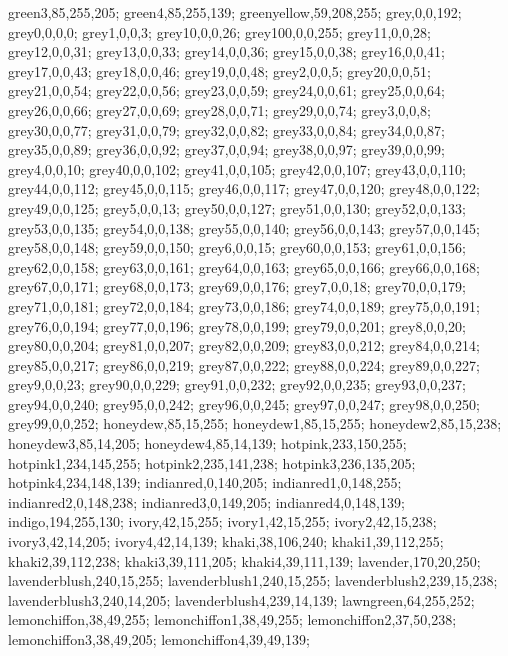 {green3,85,255,205;%
green4,85,255,139;%
greenyellow,59,208,255;%
grey,0,0,192;%
grey0,0,0,0;%
grey1,0,0,3;%
grey10,0,0,26;%
grey100,0,0,255;%
grey11,0,0,28;%
grey12,0,0,31;%
grey13,0,0,33;%
grey14,0,0,36;%
grey15,0,0,38;%
grey16,0,0,41;%
grey17,0,0,43;%
grey18,0,0,46;%
grey19,0,0,48;%
grey2,0,0,5;%
grey20,0,0,51;%
grey21,0,0,54;%
grey22,0,0,56;%
grey23,0,0,59;%
grey24,0,0,61;%
grey25,0,0,64;%
grey26,0,0,66;%
grey27,0,0,69;%
grey28,0,0,71;%
grey29,0,0,74;%
grey3,0,0,8;%
grey30,0,0,77;%
grey31,0,0,79;%
grey32,0,0,82;%
grey33,0,0,84;%
grey34,0,0,87;%
grey35,0,0,89;%
grey36,0,0,92;%
grey37,0,0,94;%
grey38,0,0,97;%
grey39,0,0,99;%
grey4,0,0,10;%
grey40,0,0,102;%
grey41,0,0,105;%
grey42,0,0,107;%
grey43,0,0,110;%
grey44,0,0,112;%
grey45,0,0,115;%
grey46,0,0,117;%
grey47,0,0,120;%
grey48,0,0,122;%
grey49,0,0,125;%
grey5,0,0,13;%
grey50,0,0,127;%
grey51,0,0,130;%
grey52,0,0,133;%
grey53,0,0,135;%
grey54,0,0,138;%
grey55,0,0,140;%
grey56,0,0,143;%
grey57,0,0,145;%
grey58,0,0,148;%
grey59,0,0,150;%
grey6,0,0,15;%
grey60,0,0,153;%
grey61,0,0,156;%
grey62,0,0,158;%
grey63,0,0,161;%
grey64,0,0,163;%
grey65,0,0,166;%
grey66,0,0,168;%
grey67,0,0,171;%
grey68,0,0,173;%
grey69,0,0,176;%
grey7,0,0,18;%
grey70,0,0,179;%
grey71,0,0,181;%
grey72,0,0,184;%
grey73,0,0,186;%
grey74,0,0,189;%
grey75,0,0,191;%
grey76,0,0,194;%
grey77,0,0,196;%
grey78,0,0,199;%
grey79,0,0,201;%
grey8,0,0,20;%
grey80,0,0,204;%
grey81,0,0,207;%
grey82,0,0,209;%
grey83,0,0,212;%
grey84,0,0,214;%
grey85,0,0,217;%
grey86,0,0,219;%
grey87,0,0,222;%
grey88,0,0,224;%
grey89,0,0,227;%
grey9,0,0,23;%
grey90,0,0,229;%
grey91,0,0,232;%
grey92,0,0,235;%
grey93,0,0,237;%
grey94,0,0,240;%
grey95,0,0,242;%
grey96,0,0,245;%
grey97,0,0,247;%
grey98,0,0,250;%
grey99,0,0,252;%
honeydew,85,15,255;%
honeydew1,85,15,255;%
honeydew2,85,15,238;%
honeydew3,85,14,205;%
honeydew4,85,14,139;%
hotpink,233,150,255;%
hotpink1,234,145,255;%
hotpink2,235,141,238;%
hotpink3,236,135,205;%
hotpink4,234,148,139;%
indianred,0,140,205;%
indianred1,0,148,255;%
indianred2,0,148,238;%
indianred3,0,149,205;%
indianred4,0,148,139;%
indigo,194,255,130;%
ivory,42,15,255;%
ivory1,42,15,255;%
ivory2,42,15,238;%
ivory3,42,14,205;%
ivory4,42,14,139;%
khaki,38,106,240;%
khaki1,39,112,255;%
khaki2,39,112,238;%
khaki3,39,111,205;%
khaki4,39,111,139;%
lavender,170,20,250;%
lavenderblush,240,15,255;%
lavenderblush1,240,15,255;%
lavenderblush2,239,15,238;%
lavenderblush3,240,14,205;%
lavenderblush4,239,14,139;%
lawngreen,64,255,252;%
lemonchiffon,38,49,255;%
lemonchiffon1,38,49,255;%
lemonchiffon2,37,50,238;%
lemonchiffon3,38,49,205;%
lemonchiffon4,39,49,139;%
}

